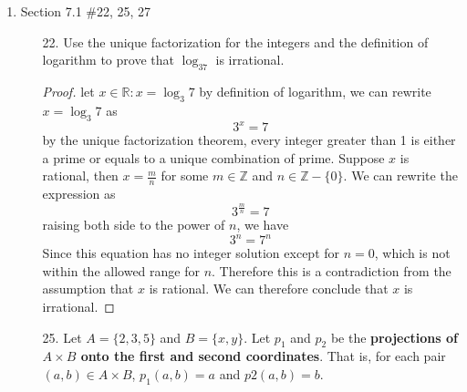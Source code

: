 \documentclass[12pt]{article}
\newcommand{\Z}{\mathbb{Z}}
\newcommand{\R}{\mathbb{R}}
\newcommand{\zero}{\{0\}}
\DeclarePairedDelimiter\ceil{\lceil}{\rceil}
\DeclarePairedDelimiter\floor{\lfloor}{\rfloor}
\begin{document}
\begin{enumerate}
\begin{enumerate}
            \item[14.] Define functions $H$ and $K$ from $\R$ to $\R$ by the following formulas for all real $x$:
                \[
                 H(x) = \floor*{x}+1\quad K(x) = \ceil*{x}
                \]
                Does $\mathbf{H} = \mathbf{K}$?
                \begin{proof}
                    Choose $x = 0.5 \in \R$, we have
                    \[
                    H(x) = 1 \quad K(x) = 2
                    \]
                    These function are not equal across every single $x$
                    
                    
                \end{proof}
                
        \end{enumerate}
    \newpage
    \item Section 7.1 \#22, 25, 27
        \begin{enumerate}
            \item[22.] Use the unique factorization for the integers and the definition of logarithm to prove that $\log_37$ is irrational.
            \begin{proof}
                let $x \in \R : x = \log_3 7$ by definition of logarithm, we can rewrite $x=\log_3 7$ as 
                    \[
                    3^x = 7
                    \]
                by the unique factorization theorem, every integer greater than 1 is either a prime or equals to a unique combination of prime. Suppose $x$ is rational, then $x = \frac{m}{n}$ for some $m \in \Z$ and $n \in \Z - \zero$. We can rewrite the expression as
                    \[
                    3^\frac{m}{n} = 7
                    \]
                raising both side to the power of $n$, we have
                    \[
                    3^n = 7^n
                    \]
                Since this equation has no integer solution except for $n=0$, which is not within the allowed range for $n$. Therefore this is a contradiction from the assumption that $x$ is rational. We can therefore conclude that $x$ is irrational. 
            \end{proof}     

        \item[25.] Let $A = \{2, 3, 5\}$ and $B = \{x, y\}$. Let $p_1$ and $p_2$ be the \textbf{projections of $A \times B$ onto the first and second coordinates}. That is, for each pair $(a, b) \in A \times B$, $p_1(a, b) = a$ and $p2(a, b) = b$.


\end{enumerate}
\end{enumerate}
\end{document}
